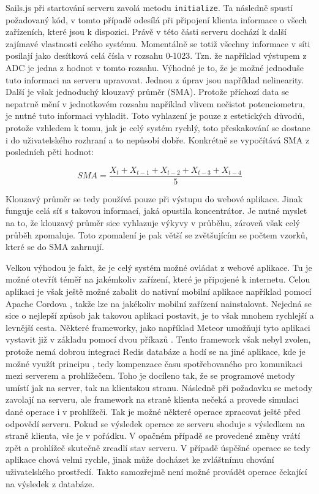 Sails.js při startování serveru zavolá metodu \texttt{initialize}. Ta následně spustí požadovaný kód, v tomto případě odesílá při připojení klienta informace o všech zařízeních, které jsou k dispozici. Právě v této části serveru dochází k další zajímavé vlastnosti celého systému. Momentálně se totiž všechny informace v síti posílají jako desítková celá čísla v rozsahu 0-1023. Tzn. že například výstupem z ADC je jedna z hodnot v tomto rozsahu. Výhodné je to, že je možné jednoduše tuto informaci na serveru upravovat. Jednou z úprav jsou například nelinearity. Další je však jednoduchý klouzavý průměr (SMA). Protože příchozí data se nepatrně mění v jednotkovém rozsahu například vlivem nečistot potenciometru, je nutné tuto informaci vyhladit. Toto vyhlazení je pouze z estetických důvodů, protože vzhledem k tomu, jak je celý systém rychlý, toto přeskakování se dostane i do uživatelského rozhraní a to nepůsobí dobře. Konkrétně se vypočítává SMA z posledních pěti hodnot:

\begin{equation}
	SMA = \dfrac{X_t + X_{t-1} + X_{t-2} + X_{t-3} + X_{t-4}}{5}
	\label{eq:sma}
\end{equation}

Klouzavý průměr se tedy používá pouze při výstupu do webové aplikace. Jinak funguje celá síť s takovou informací, jaká opustila koncentrátor. Je nutné myslet na to, že klouzavý průměr sice vyhlazuje výkyvy v průběhu, zároveň však celý průběh zpomaluje. Toto zpomalení je pak větší se zvět\-šu\-jí\-cím se počtem vzorků, které se do SMA zahrnují.

Velkou výhodou je fakt, že je celý systém možné ovládat z webové aplikace. Tu je možné otevřít téměř na jakémkoliv zařízení, které je připojené k internetu. Celou aplikaci je však ještě možné zabalit do nativní mobilní aplikace například pomocí Apache Cordova \cite{cordova}, takže lze na jakékoliv mobilní zařízení nainstalovat.  Nejedná se sice o nejlepší způsob jak takovou aplikaci postavit, je to však mnohem rychlejší a levnější cesta. Některé frameworky, jako například Meteor umožňují tyto aplikaci vystavit již v základu pomocí dvou příkazů \cite{meteor}. Tento framework však nebyl zvolen, protože nemá dobrou integraci Redis \cite{redis} databáze a hodí se na jiné aplikace, kde je možné využít principu ,  tedy kompenzace času spotřebovaného pro komunikaci mezi serverem a prohlížečem. Toho je docíleno tak, že se programové metody umístí jak na server, tak na klientskou stranu. Následně při požadavku se metody zavolají na serveru, ale framework na straně klienta nečeká a provede simulaci dané operace i v prohlížeči. Tak je možné některé operace zpracovat ještě před odpovědí serveru. Pokud se výsledek operace ze serveru shoduje s výsledkem na straně klienta, vše je v pořádku. V opačném případě se provedené změny vrátí zpět a prohlížeč skutečně zrcadlí stav serveru. V případě úspěšné operace se tedy aplikace chová velmi rychle, jinak může docházet ke zvláštnímu chování uživatelského prostředí. Takto samozřejmě není možné provádět operace čekající na výsledek z databáze.